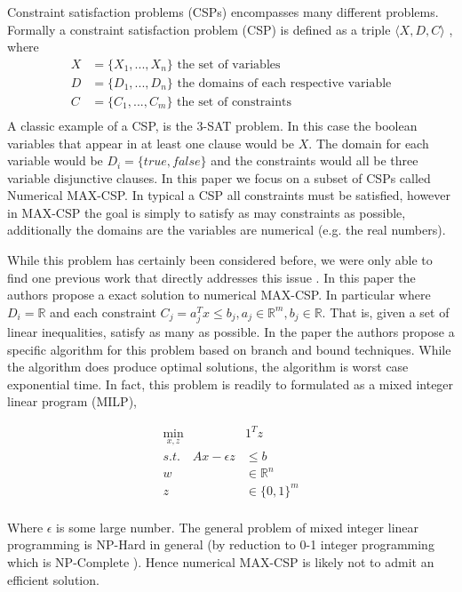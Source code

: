 \documentclass[a4paper]{article}
\begin{document}
Constraint satisfaction problems (CSPs) encompasses many different problems. Formally a 
constraint satisfaction problem (CSP) is defined as a triple $\langle X, D, C \rangle$ \cite{wiki_CSP}, where 
\begin{align*}
	X &= \{X_1, ..., X_n\} \text{ the set of variables}\\
	D &= \{D_1, ..., D_n\} \text{ the domains of each respective variable}\\
	C &= \{C_1, ..., C_m\} \text{ the set of constraints}\\
\end{align*}
A classic example of a CSP, is the 3-SAT problem. In this case
the boolean variables that appear in at least one clause would be $X$. The domain for 
each variable would be $D_i = \{true, false\}$ and the constraints would all be 
three variable disjunctive clauses. 
In this paper we focus on a subset of CSPs called Numerical MAX-CSP. 
In typical a CSP all constraints must be satisfied, however in MAX-CSP the goal is simply to 
satisfy as may constraints as possible, additionally the domains are the variables 
are numerical (e.g. the real numbers). 

While this problem has certainly been considered before, we were only able to find one previous 
work that directly addresses this issue \cite{num_max_csp_paper}.
In this paper the authors propose a exact solution to numerical MAX-CSP. In particular where 
$D_i = \mathds{R}$ and each constraint $C_j = a_j^Tx \leq b_j, a_j \in \mathds{R}^m, b_j \in \mathds{R}$. 
That is, given a set of linear inequalities, satisfy as many as possible. In the paper the authors 
propose a specific algorithm for this problem based on branch and bound techniques. While the algorithm 
does produce optimal solutions, the algorithm is worst case exponential time.
In fact, this problem is readily to formulated as a mixed integer linear program (MILP),

\begin{align*}
\min_{x,z}\quad &1^Tz\\
s.t. \quad Ax - \epsilon z &\leq b\\
		w &\in \mathds{R}^n\\
		z &\in \{0,1\}^m\\
\end{align*}

Where $\epsilon$ is some large number. The general problem of mixed integer linear programming is 
NP-Hard in general (by reduction to 0-1 integer programming which is NP-Complete \cite{karp_1972}). Hence 
numerical MAX-CSP is likely not to admit an efficient solution. 
\end{document}
